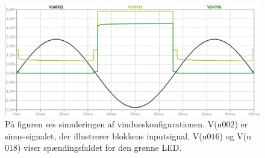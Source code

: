 \begin{figure}[H]
	\centering
	\includegraphics[scale=0.36]{figures/cProblemloesning/vindues_konfiguration.PNG}
	\caption{På figuren ses simuleringen af vindueskonfigurationen. V(n$002$) er sinus-signalet, der illustrerer blokkens inputsignal, V(n$016$) og V(n$018$) viser spændingsfaldet for den grønne LED.}
	\label{fig:vindues_konfiguration}
\end{figure}

